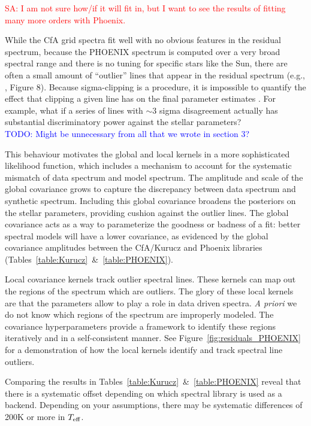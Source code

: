 \documentclass[iop,floatfix]{emulateapj}
\newcommand{\todo}[1]{ \textcolor{blue}{\\TODO: #1}}
\newcommand{\comm}[1]{ \textcolor{red}{SA: #1}}
\begin{document}
\comm{I am not sure how/if it will fit in, but I want to see the results of fitting many more 
orders with Phoenix.}

While the CfA grid spectra fit well with no obvious features in the residual spectrum, because the PHOENIX spectrum is computed over a very broad spectral range and there is no tuning for specific stars like the Sun, there are often a small amount of  ``outlier'' lines that appear in the residual spectrum (e.g., \citealt{husser13}, Figure 8). Because sigma-clipping is a procedure, it is impossible to quantify the effect that clipping a given line has on the final parameter estimates \citep{hogg10}. For example, what if a series of lines with $\sim$3 sigma disagreement actually has substantial discriminatory power against the stellar parameters? \todo{Might be unnecessary from all that we wrote in section 3?}

This behaviour motivates the global and local kernels in a more sophisticated likelihood function, which includes a mechanism to account for the systematic mismatch of data spectrum and model spectrum.  The amplitude and scale of the global covariance grows to capture the discrepancy between data spectrum and synthetic spectrum. Including this global covariance broadens the posteriors on the stellar parameters, providing cushion against the outlier lines.  The global covariance acts as a way to parameterize the goodness or badness of a fit: better spectral models will have a lower covariance, as evidenced by the global covariance amplitudes between the {\sc CfA/Kurucz} and {\sc Phoenix} libraries (Tables~\ref{table:Kurucz}~\&~\ref{table:PHOENIX}).

Local covariance kernels track outlier spectral lines. These kernels can map out the regions of the spectrum which are outliers. The glory of these local kernels are that the parameters allow to play a role in data driven spectra. \emph{A priori} we do not know which regions of the spectrum are improperly modeled. The covariance hyperparameters provide a framework to identify these regions iteratively and in a self-consistent manner.  See Figure~\ref{fig:residuals_PHOENIX} for a demonstration of how the local kernels identify and track spectral line outliers.

Comparing the results in Tables~\ref{table:Kurucz}~\&~\ref{table:PHOENIX} reveal that there is a systematic offset depending on which spectral library is used as a backend. Depending on your assumptions, there may be systematic differences of 200K or more in $T_{\rm eff}$.
\end{document}

